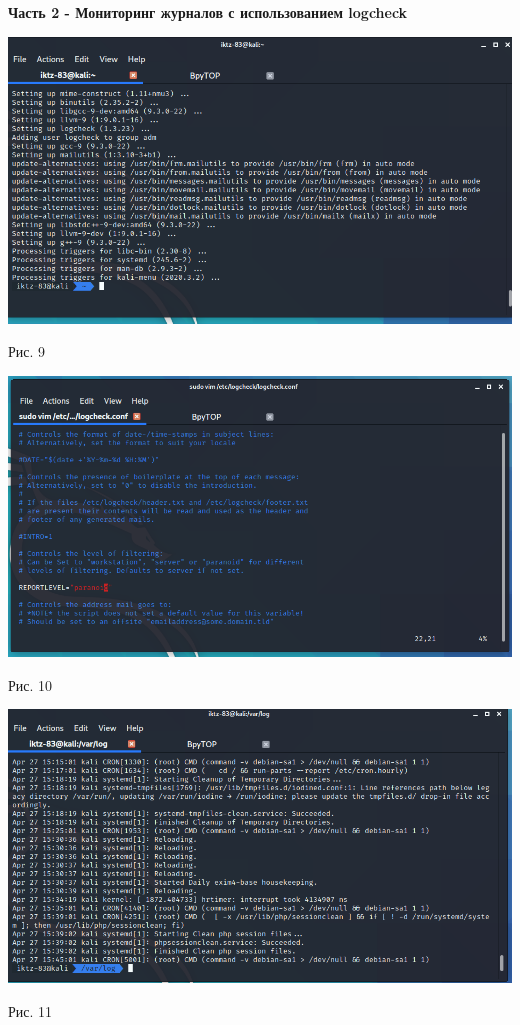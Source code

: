 \documentclass[a4paper,14pt]{extarticle}
\begin{document}
    \newpage
    \textbf{Часть 2 - Мониторинг журналов с использованием logcheck}
    \begin{center}

        \includegraphics[scale=0.5]{pics/9.png}

        Рис. 9  

        \includegraphics[scale=0.5]{pics/10.png}

        Рис. 10 

        \includegraphics[scale=0.5]{pics/11.png}

        Рис. 11 

   \end{center}
\end{document}
